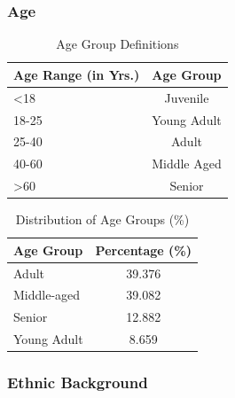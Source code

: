 \documentclass[11pt]{article}
\begin{document}
\subsubsection{Age}

\begin{table}[H]
\centering
\caption{Age Group Definitions}
\begin{tabularx}{\columnwidth}{|X|c|}
\hline
\textbf{Age Range (in Yrs.)} & \textbf{Age Group} \\
\hline
<18 & Juvenile \\
\hline
18-25 & Young Adult \\
\hline
25-40 & Adult \\
\hline
40-60 & Middle Aged \\
\hline
>60 & Senior \\
\hline
\end{tabularx}
\end{table}

\begin{table}[H]
\centering
\caption{Distribution of Age Groups (\%)}
\begin{tabularx}{\columnwidth}{|X|c|}
\hline
\textbf{Age Group} & \textbf{Percentage (\%)} \\
\hline
Adult & 39.376 \\
\hline
Middle-aged & 39.082 \\
\hline
Senior & 12.882 \\
\hline
Young Adult & 8.659 \\
\hline
\end{tabularx}
\end{table}

\subsubsection{Ethnic Background}
\end{document}
